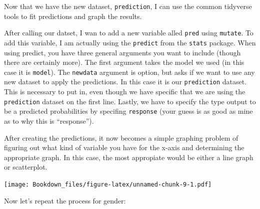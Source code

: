 \documentclass[]{book}
\newenvironment{Shaded}{\begin{snugshade}}{\end{snugshade}}
\newcommand{\KeywordTok}[1]{\textcolor[rgb]{0.13,0.29,0.53}{\textbf{#1}}}
\newcommand{\DataTypeTok}[1]{\textcolor[rgb]{0.13,0.29,0.53}{#1}}
\newcommand{\StringTok}[1]{\textcolor[rgb]{0.31,0.60,0.02}{#1}}
\newcommand{\OperatorTok}[1]{\textcolor[rgb]{0.81,0.36,0.00}{\textbf{#1}}}
\newcommand{\NormalTok}[1]{#1}
\begin{document}
Now that we have the new dataset, \texttt{prediction}, I can use the
common tidyverse tools to fit predictions and graph the results.

After calling our datset, I wan to add a new variable alled
\texttt{pred} using \texttt{mutate}. To add this variable, I am actually
using the \texttt{predict} from the \texttt{stats} package. When using
predict, you have three general arguments you want to include (though
there are certainly more). The first argument takes the model we used
(in this case it is \texttt{model}). The \texttt{newdata} argument is
option, but asks if we want to use any new dataset to apply the
predictions. In this case it is our \texttt{prediction} dataset. This is
necessary to put in, even though we have specific that we are using the
\texttt{prediction} dataset on the first line. Lastly, we have to
specify the type output to be a predicted probabilities by specifing
\texttt{response} (your guess is as good as mine as to why this is
``response'').

After creating the predictions, it now becomes a simple graphing problem
of figuring out what kind of variable you have for the x-axis and
determining the appropriate graph. In this case, the most appropiate
would be either a line graph or scatterplot.

\begin{Shaded}
\end{Shaded}

\texttt{[image: Bookdown\_files/figure-latex/unnamed-chunk-9-1.pdf]}

Now let's repeat the process for gender:

\begin{Shaded}
\end{Shaded}
\end{document}
